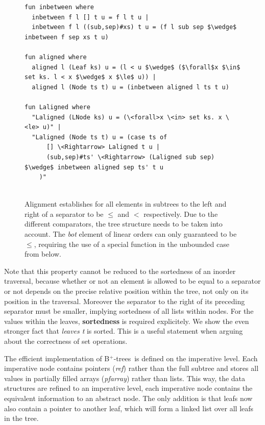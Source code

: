 \documentclass[a4paper,UKenglish,cleveref, autoref, thm-restate]{lipics-v2021}
\newcommand{\btrees}{B$^+$-trees}
\begin{document}
\begin{figure}
\begin{lstlisting}[mathescape=true, language=Isabelle,label=lst:btree-alignment-def]
fun inbetween where
  inbetween f l [] t u = f l t u |
  inbetween f l ((sub,sep)#xs) t u = (f l sub sep $\wedge$ inbetween f sep xs t u)

fun aligned where
  aligned l (Leaf ks) u = (l < u $\wedge$ ($\forall$x $\in$ set ks. l < x $\wedge$ x $\le$ u)) |
  aligned l (Node ts t) u = (inbetween aligned l ts t u)

fun Laligned where
  "Laligned (LNode ks) u = (\<forall>x \<in> set ks. x \<le> u)" |
  "Laligned (Node ts t) u = (case ts of
      [] \<Rightarrow> Laligned t u |
      (sub,sep)#ts' \<Rightarrow> (Laligned sub sep) $\wedge$ inbetween aligned sep ts' t u
    )"
  
\end{lstlisting}
\caption[Definition of Alignment]{Alignment establishes for all elements in subtrees
to the left and right of a separator to be $\leq$ and $<$ respectively. Due to the different comparators, the tree structure needs
to be taken into account. The \emph{bot} element of linear orders can only guaranteed
to be $\leq$, requiring the use of a special function in the unbounded case from below.}
\label{fig:btree-alignment-def}
\end{figure}


Note that this property cannot be reduced to the sortedness of an inorder traversal,
because whether or not an element is allowed to be equal to a separator or not
depends on the precise relative position within the tree, not only on its position in the traversal.
Moreover the separator to the right of its preceding separator must be smaller,
implying sortedness of all lists within nodes.
For the values within the leaves, \textbf{sortedness} is required explicitely.
We show the even stronger fact that \emph{leaves t} is sorted.
This is a useful statement when arguing about the correctness of set operations.

The efficient implementation of \btrees\ is defined
on the imperative level.
Each imperative node contains pointers (\emph{ref}) rather than the full subtree and
stores all values in partially filled arrays (\emph{pfarray}) rather than lists.
This way, the data structures are refined to an imperative level,
each imperative node contains the equivalent information to an abstract node.
The only addition is that leafs now also contain a pointer to another leaf,
which will form a linked list over all leafs in the tree.
\end{document}
